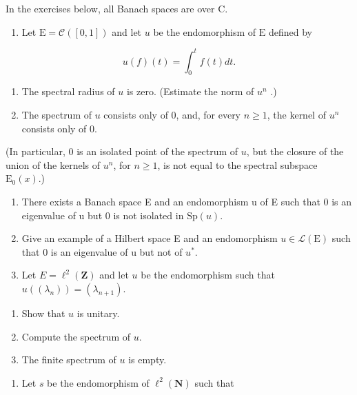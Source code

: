 
In the exercises below, all Banach spaces are over C.

\begin{enumerate}
\def\labelenumi{\arabic{enumi})}
\tightlist
\item
  Let \(\mathrm{E} = \mathcal{C}([0,1])\) and let \(u\) be the endomorphism of \(\mathrm{E}\) defined by
\end{enumerate}

\[
u (f) (t) = \int_ {0} ^ {t} f (t) d t.
\]

\begin{enumerate}
\def\labelenumi{\alph{enumi})}
\item
  The spectral radius of \(u\) is zero. (Estimate the norm of \(u^n\) .)
\item
  The spectrum of \(u\) consists only of 0, and, for every \(n \geqslant 1\), the kernel of \(u^{n}\) consists only of 0.
\end{enumerate}

(In particular, 0 is an isolated point of the spectrum of \(u\), but the closure of the union of the kernels of \(u^n\), for \(n \geqslant 1\), is not equal to the spectral subspace \(\mathrm{E}_0(x)\).)

\begin{enumerate}
\def\labelenumi{\arabic{enumi})}
\setcounter{enumi}{1}
\item
  There exists a Banach space E and an endomorphism u of E such that 0 is an eigenvalue of u but 0 is not isolated in \(\mathrm{Sp}(u)\).
\item
  Give an example of a Hilbert space E and an endomorphism \(u \in \mathcal{L}(\mathrm{E})\) such that 0 is an eigenvalue of u but not of \(u^{*}\).
\item
  Let \(E = \ell^{2}(\mathbf{Z})\) and let \(u\) be the endomorphism such that \(u((\lambda_{n})) = (\lambda_{n+1})\).
\end{enumerate}

\begin{enumerate}
\def\labelenumi{\alph{enumi})}
\item
  Show that \(u\) is unitary.
\item
  Compute the spectrum of \(u\).
\item
  The finite spectrum of \(u\) is empty.
\end{enumerate}

\begin{enumerate}
\def\labelenumi{\arabic{enumi})}
\setcounter{enumi}{4}
\tightlist
\item
  Let \(s\) be the endomorphism of \(\ell^2 (\mathbf{N})\) such that
\end{enumerate}

